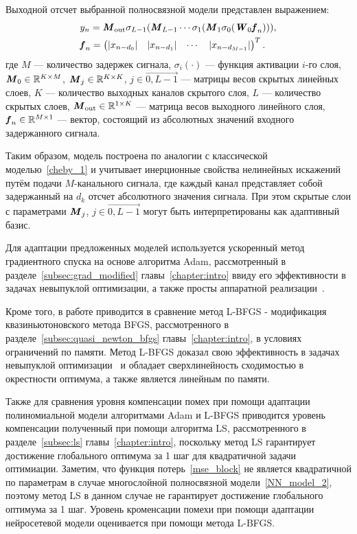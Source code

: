 Выходной отсчет выбранной полносвязной модели представлен выражением:
\begin{align}
	&y_n=\textbf{\textit{M}}_{\text{out}}\sigma_{L-1}(\textbf{\textit{M}}_{L-1}\cdots\sigma_{1}(\textbf{\textit{M}}_{1}\sigma_{0}(\textbf{\textit{W}}_{0}\textbf{\textit{f}}_n))), 
	\label{NN_model_1}
	\\
	&\textbf{\textit{f}}_n=\begin{pmatrix}
		|x_{n-d_0}| & |x_{n-d_1}| & \cdots & |x_{n-d_{M-1}}|
	\end{pmatrix}^T.
	\label{NN_model_2}
\end{align}
где $M$ — количество задержек сигнала, $\sigma_{i}(\cdot)$ — функция активации $i$-го слоя, $\textbf{\textit{M}}_{0}\in\mathbb{R}^{K\times M}$, $\textbf{\textit{M}}_{j}\in\mathbb{R}^{K\times K}$, $j\in\overrightarrow{0, L-1}$ — матрицы весов скрытых линейных слоев, $K$ — количество выходных каналов скрытого слоя, $L$ — количество скрытых слоев, $\textbf{\textit{M}}_{\text{out}}\in\mathbb{R}^{1\times K}$ — матрица весов выходного линейного слоя, $\textbf{\textit{f}}_n\in\mathbb{R}^{M\times 1}$ — вектор, состоящий из абсолютных значений входного задержанного сигнала.

Таким образом, модель построена по аналогии с классической моделью~\eqref{cheby_1} и учитывает инерционные свойства нелинейных искажений путём подачи $M$-канального сигнала, где каждый канал представляет собой задержанный на $d_k$ отсчет абсолютного значения сигнала. При этом скрытые слои с параметрами $\textbf{\textit{M}}_{j}$, $j\in\overrightarrow{0, L-1}$ могут быть интерпретированы как адаптивный базис.

Для адаптации предложенных моделей используется ускоренный метод градиентного спуска на основе алгоритма Adam, рассмотренный в разделе~\ref{subsec:grad_modified} главы~\ref{chapter:intro} ввиду его эффективности в задачах невыпуклой оптимизации, а также просты аппаратной реализации~\cite{kingma2014adam}. 

Кроме того, в работе приводится в сравнение метод L-BFGS - модификация квазиньютоновского метода BFGS, рассмотренного в разделе~\ref{subsec:quasi_newton_bfgs} главы~\ref{chapter:intro}, в условиях ограничений по памяти. Метод L-BFGS доказал свою эффективность в задачах невыпуклой оптимизации~\cite{liu1989limited} и обладает сверхлинейность сходимостью в окрестности оптимума, а также является линейным по памяти.

Также для сравнения уровня компенсации помех при помощи адаптации полиномиальной модели алгоритмами Adam и L-BFGS приводится уровень компенсации полученный при помощи алгоритма LS, рассмотренного в разделе~\ref{subsec:ls} главы~\ref{chapter:intro}, поскольку метод LS гарантирует достижение глобального оптимума за 1 шаг для квадратичной задачи оптимиации. Заметим, что функция потерь~\eqref{mse_block} не является квадратичной по параметрам в случае многослойной полносвязной модели~\eqref{NN_model_2}, поэтому метод LS в данном случае не гарантирует достижение глобального оптимума за 1 шаг. Уровень кроменсации помехи при помощи адаптации нейросетевой модели оценивается при помощи метода L-BFGS.

